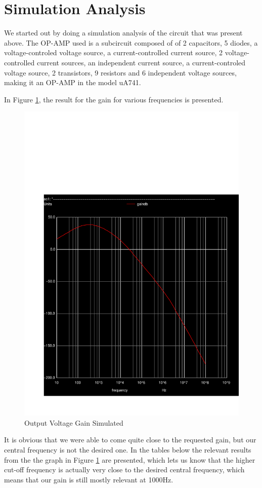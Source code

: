 \clearpage

\section{Simulation Analysis}
\label{sec:simulation}

We started out by doing a simulation analysis of the circuit that was present above. The OP-AMP used is a subcircuit composed of of 2 capacitors, 5 diodes, a voltage-controled voltage source, a current-controlled current source, 2 voltage-controlled current sources, an independent current source, a current-controled voltage source, 2 transistors, 9 resistors and 6 independent voltage sources, making it an OP-AMP in the model uA741.

In Figure \ref{fig:sim-gain}, the result for the gain for various frequencies is presented.

\vspace{-3cm}

\begin{figure}[H] \centering
\includegraphics[width=0.5\linewidth]{../sim/gain.pdf}
\caption{Output Voltage Gain Simulated}
\label{fig:sim-gain}
\end{figure}

It is obvious that we were able to come quite close to the requested gain, but our central frequency is not the desired one. In the tables below the relevant results from the the graph in Figure \ref{fig:sim-gain} are presented, which lets us know that the higher cut-off frequency is actually very close to the desired central frequency, which means that our gain is still mostly relevant at 1000Hz.

